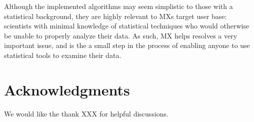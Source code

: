 \documentclass[review]{siamart0516}
\begin{document}
Although the implemented algorithms may seem simplistic to those with a statistical background, they are highly relevant to MXs target user base: scientists with minimal knowledge of statistical techniques who would otherwise be unable to properly analyze their data. As such, MX helps resolves a very important issue, and is the a small step in the process of enabling anyone to use statistical tools to examine their data.

\appendix

\section{Acknowledgments}
\label{sec:ack}
We would like the thank XXX for helpful discussions.



\end{document}
